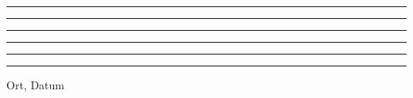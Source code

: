 \documentclass[a4paper,12pt]{scrartcl}
\begin{document}
	


\begin{center}
	\rule{6cm}{.5pt} \hspace{3cm} \rule{6cm}{.5pt}
\end{center}
\vspace{1cm}
\begin{center}
	\rule{6cm}{.5pt} \hspace{3cm} \rule{6cm}{.5pt}
\end{center}

\vspace{3cm}
	\begin{center}
	\rule{6cm}{.5pt} \hspace{3cm} \rule{6cm}{0pt}
\end{center}	
\vspace{-5mm}
\hspace*{25mm} Ort, Datum	
\end{document}
